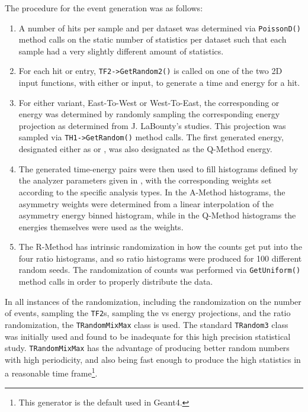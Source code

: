 The procedure for the event generation was as follows:
\begin{enumerate}
	\item{A number of hits per sample and per dataset was determined via \texttt{PoissonD()} method calls on the static number of statistics per dataset such that each sample had a very slightly different amount of statistics.} 
	\item{For each hit or entry, \texttt{TF2->GetRandom2()} is called on one of the two 2D input functions, with either \RE or \RW input, to generate a time and energy for a hit.}
	\item{For either variant, East-To-West or West-To-East, the corresponding \RW or \RE energy was determined by randomly sampling the corresponding energy projection as determined from J. LaBounty's studies. This projection was sampled via \texttt{TH1->GetRandom()} method calls. The first generated energy, designated either as \RE or \RW, was also designated as the Q-Method energy.}
	\item{The generated time-energy pairs were then used to fill histograms defined by the analyzer parameters given in , with the corresponding weights set according to the specific analysis types. In the A-Method histograms, the asymmetry weights were determined from a linear interpolation of the asymmetry energy binned histogram, while in the Q-Method histograms the energies themselves were used as the weights.}
	\item{The R-Method has intrinsic randomization in how the counts get put into the four ratio histograms, and so ratio histograms were produced for 100 different random seeds. The randomization of counts was performed via \texttt{GetUniform()} method calls in order to properly distribute the data.}
\end{enumerate}


In all instances of the randomization, including the randomization on the number of events, sampling the \texttt{TF2}s, sampling the \RE vs \RW energy projections, and the ratio randomization, the \ROOT \texttt{TRandomMixMax} class is used. The standard \texttt{TRandom3} class was initially used and found to be inadequate for this high precision statistical study. \texttt{TRandomMixMax} has the advantage of producing better random numbers with high periodicity, and also being fast enough to produce the high statistics in a reasonable time frame\footnote{This generator is the default used in Geant4.}\cite{TRandom}.



